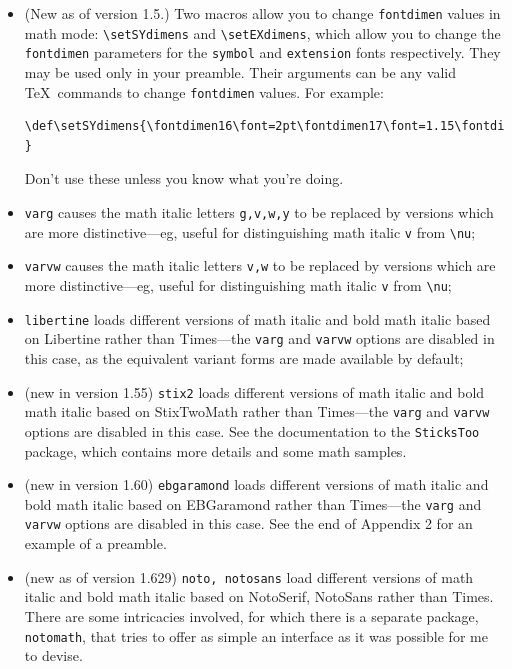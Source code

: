 \documentclass[\fsc]{article}
\theoremstyle{oldplain}
\theoremstyle{plain}
\begin{document}
\begin{itemize}
\[\sum \Sumop \sum \smallsum\]
Similarly, there are \verb|\smallprod| and \verb|\smallcoprod| which, along with \verb|\smallsum|, are of class {\tt mathop}, unlike their Greek letter equivalents.
\item (New as of version 1.5.) Two macros allow you to change {\tt fontdimen} values in math mode: \verb|\setSYdimens| and \verb|\setEXdimens|, which allow you to change the {\tt fontdimen} parameters for the {\tt symbol} and {\tt extension} fonts respectively. They may be used only in your preamble. Their arguments can be any valid \TeX\ commands to change {\tt fontdimen} values. For example:
\begin{verbatim}
\def\setSYdimens{\fontdimen16\font=2pt\fontdimen17\font=1.15\fontdimen17\font }
\end{verbatim}
Don't use these unless you know what you're doing.
\item {\tt varg} causes the math italic letters \verb|g,v,w,y| to be replaced by versions which are more distinctive---eg, useful for distinguishing math italic \verb|v| from \verb|\nu|;
\item {\tt varvw} causes the math italic letters \verb|v,w| to be replaced by versions which are more distinctive---eg, useful for distinguishing math italic \verb|v| from \verb|\nu|;
\item {\tt libertine} loads different versions of math italic and bold math italic based on \textsf{Libertine} rather than \textsf{Times}---the {\tt varg} and {\tt varvw} options are disabled in this case, as the equivalent variant forms are made available by default;
\item (new in version 1.55) {\tt stix2} loads different versions of math italic and bold math italic based on \textsf{StixTwoMath} rather than \textsf{Times}---the {\tt varg} and {\tt varvw} options are disabled in this case. See the documentation to the {\tt SticksToo} package, which contains more details and some math samples.
\item (new in version 1.60) {\tt ebgaramond} loads different versions of math italic and bold math italic based on \textsf{EBGaramond} rather than \textsf{Times}---the {\tt varg} and {\tt varvw} options are disabled in this case. See the end of Appendix 2 for an example of a preamble.
\item (new as of version 1.629) {\tt noto, notosans} load different versions of math italic and bold math italic based on \textsf{NotoSerif}, \textsf{NotoSans}  rather than \textsf{Times}. There are some intricacies involved, for which there is a separate package, {\tt notomath}, that tries to offer as simple an interface as it was possible for me to devise.

\end{itemize}
\end{document}
